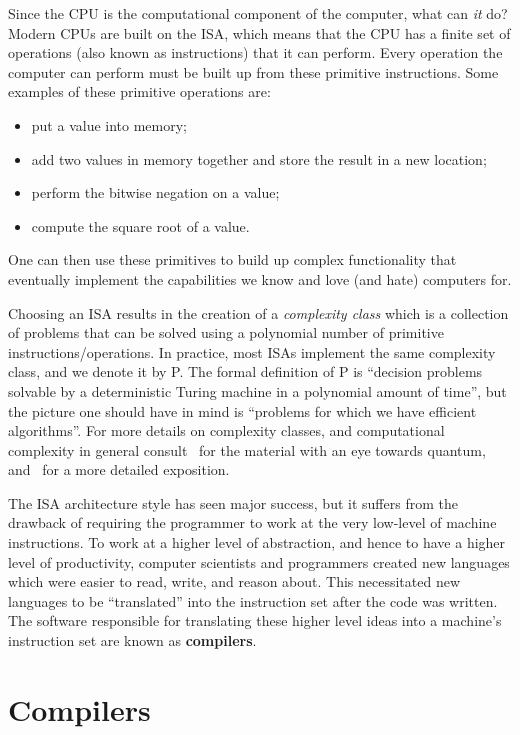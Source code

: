 Since the \ac{CPU} is the computational component of the computer, what can \emph{it} do?
Modern \acp{CPU} are built on the \ac{ISA}, which means that the \ac{CPU} has a finite set of operations (also known as instructions) that it can perform.
Every operation the computer can perform must be built up from these primitive instructions.
Some examples of these primitive operations are:
\begin{itemize}
    \item put a value into memory;
    \item add two values in memory together and store the result in a new location;
    \item perform the bitwise negation on a value;
    \item compute the square root of a value.
\end{itemize}
One can then use these primitives to build up complex functionality that eventually implement the capabilities we know and love (and hate) computers for.

Choosing an \ac{ISA} results in the creation of a \emph{complexity class} which is a collection of problems that can be solved using a polynomial number of primitive instructions/operations.
In practice, most \acp{ISA} implement the same complexity class, and we denote it by P. %
The formal definition of P is ``decision problems solvable by a deterministic Turing machine in a polynomial amount of time'', but the picture one should have in mind is ``problems for which we have efficient algorithms''.
For more details on complexity classes, and computational complexity in general consult~\cite[Chapter 3]{nielsenchuang} for the material with an eye towards quantum, and~\cite{complexity} for a more detailed exposition.

The \ac{ISA} architecture style has seen major success, but it suffers from the drawback of requiring the programmer to work at the very low-level of machine instructions.
To work at a higher level of abstraction, and hence to have a higher level of productivity, computer scientists and programmers created new languages which were easier to read, write, and reason about.
This necessitated new languages to be ``translated'' into the instruction set after the code was written.
The software responsible for translating these higher level ideas into a machine's instruction set are known as \textbf{compilers}.

\section{Compilers}

